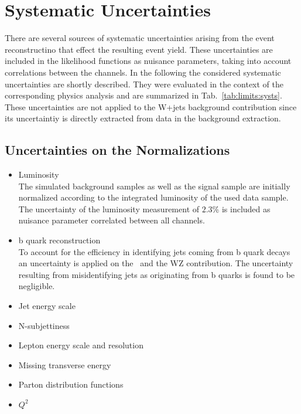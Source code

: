 \section{Systematic Uncertainties}
\label{sec:systematics}
There are several sources of systematic uncertainties arising from the event reconstructino that effect the resulting event yield. These uncertainties are included in the likelihood functions as nuisance parameters, taking into account correlations between the channels. In the following the considered systematic uncertainties are shortly described. They were evaluated in the context of the corresponding physics analysis \cite{PAS} and are summarized in Tab.~\ref{tab:limits:systs}. These uncertainties are not applied to the W+jets background contribution since its uncertaintiy is directly extracted from data in the background extraction.
\subsection*{Uncertainties on the Normalizations}
\begin{itemize}
\item Luminosity\\
The simulated background samples as well as the signal sample are initially normalized according to the integrated luminosity of the used data sample. The uncertainty of the luminosity measurement of $2.3$\% is included as nuisance parameter correlated between all channels.
\item b quark reconstruction\\
To account for the efficiency in identifying jets coming from b quark decays \cite{bquarkuncert} an uncertainty is applied on the \ttbar \ and the WZ contribution. The uncertainty resulting from misidentifying jets as originating from b quarks is found to be negligible.
\item Jet energy scale\\

\item N-subjettiness\\
\item Lepton energy scale and resolution\\
\item Missing transverse energy\\

\item Parton distribution functions\\
\item $Q^2$\\
\end{itemize}
